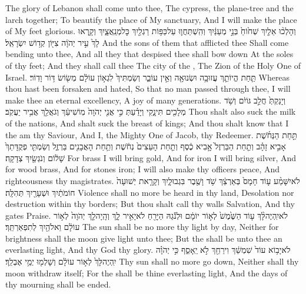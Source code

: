 {The glory of Lebanon shall come unto thee, The cypress, the plane-tree and the larch together; To beautify the place of My sanctuary, And I will make the place of My feet glorious.}
{וְהָלְכ֨וּ אֵלַ֤יִךְ שְׁח֙וֹחַ֙ בְּנֵ֣י מְעַנַּ֔יִךְ וְהִֽשְׁתַּחֲו֛וּ עַל\maqqaf כַּפּ֥וֹת רַגְלַ֖יִךְ כׇּל\maqqaf מְנַֽאֲצָ֑יִךְ וְקָ֤רְאוּ לָךְ֙ עִ֣יר יְהֹוָ֔ה צִיּ֖וֹן קְד֥וֹשׁ יִשְׂרָאֵֽל׃}
{And the sons of them that afflicted thee Shall come bending unto thee, And all they that despised thee shall bow down At the soles of thy feet; And they shall call thee The city of the \lord, The Zion of the Holy One of Israel.}
{תַּ֧חַת הֱיוֹתֵ֛ךְ עֲזוּבָ֥ה וּשְׂנוּאָ֖ה וְאֵ֣ין עוֹבֵ֑ר וְשַׂמְתִּיךְ֙ לִגְא֣וֹן עוֹלָ֔ם מְשׂ֖וֹשׂ דּ֥וֹר וָדֽוֹר׃}
{Whereas thou hast been forsaken and hated, So that no man passed through thee, I will make thee an eternal excellency, A joy of many generations.}
{וְיָנַקְתְּ֙ חֲלֵ֣ב גּוֹיִ֔ם וְשֹׁ֥ד מְלָכִ֖ים תִּינָ֑קִי וְיָדַ֗עַתְּ כִּ֣י אֲנִ֤י יְהֹוָה֙ מֽוֹשִׁיעֵ֔ךְ וְגֹאֲלֵ֖ךְ אֲבִ֥יר יַעֲקֹֽב׃}
{Thou shalt also suck the milk of the nations, And shalt suck the breast of kings; And thou shalt know that I the \lord\space am thy Saviour, And I, the Mighty One of Jacob, thy Redeemer.}
{תַּ֣חַת הַנְּחֹ֜שֶׁת אָבִ֣יא זָהָ֗ב וְתַ֤חַת הַבַּרְזֶל֙ אָ֣בִיא כֶ֔סֶף וְתַ֤חַת הָעֵצִים֙ נְחֹ֔שֶׁת וְתַ֥חַת הָאֲבָנִ֖ים בַּרְזֶ֑ל וְשַׂמְתִּ֤י פְקֻדָּתֵךְ֙ שָׁל֔וֹם וְנֹגְשַׂ֖יִךְ צְדָקָֽה׃}
{For brass I will bring gold, And for iron I will bring silver, And for wood brass, And for stones iron; I will also make thy officers peace, And righteousness thy magistrates.}
{לֹא\maqqaf יִשָּׁמַ֨ע ע֤וֹד חָמָס֙ בְּאַרְצֵ֔ךְ שֹׁ֥ד וָשֶׁ֖בֶר בִּגְבוּלָ֑יִךְ וְקָרָ֤את יְשׁוּעָה֙ חוֹמֹתַ֔יִךְ וּשְׁעָרַ֖יִךְ תְּהִלָּֽה׃}
{Violence shall no more be heard in thy land, Desolation nor destruction within thy borders; But thou shalt call thy walls Salvation, And thy gates Praise.}
{לֹא\maqqaf יִֽהְיֶה\maqqaf לָּ֨ךְ ע֤וֹד הַשֶּׁ֙מֶשׁ֙ לְא֣וֹר יוֹמָ֔ם וּלְנֹ֕גַהּ הַיָּרֵ֖חַ לֹא\maqqaf יָאִ֣יר לָ֑ךְ וְהָֽיָה\maqqaf לָ֤ךְ יְהֹוָה֙ לְא֣וֹר עוֹלָ֔ם וֵאלֹהַ֖יִךְ לְתִפְאַרְתֵּֽךְ׃}
{The sun shall be no more thy light by day, Neither for brightness shall the moon give light unto thee; But the \lord\space shall be unto thee an everlasting light, And thy God thy glory.}
{לֹא\maqqaf יָב֥וֹא עוֹד֙ שִׁמְשֵׁ֔ךְ וִירֵחֵ֖ךְ לֹ֣א יֵֽאָסֵ֑ף כִּ֣י יְהֹוָ֗ה יִֽהְיֶה\maqqaf לָּךְ֙ לְא֣וֹר עוֹלָ֔ם וְשָׁלְמ֖וּ יְמֵ֥י אֶבְלֵֽךְ׃}
{Thy sun shall no more go down, Neither shall thy moon withdraw itself; For the \lord\space shall be thine everlasting light, And the days of thy mourning shall be ended.}
